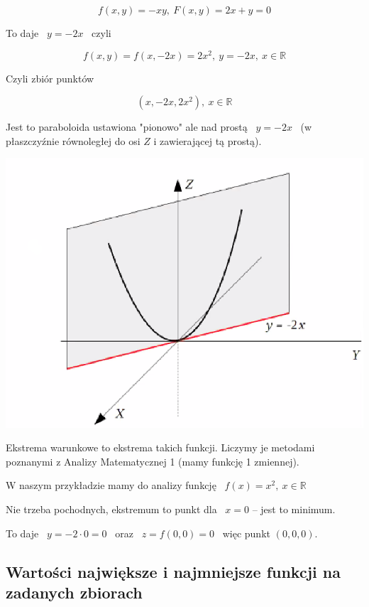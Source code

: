 \begin{przyklad}

\[ f(x,y) = -xy, \ F(x,y) = 2x + y = 0 \]

\begin{center}To daje \ $ y = -2x $ \ czyli\end{center} 
\[ f(x,y) = f(x, -2x) = 2x^2, \ y=-2x, \ x\in \mathbb{R} \]

\begin{center}Czyli zbiór punktów\end{center}
\[ (x, -2x, 2x^2), \ x \in \mathbb{R} \]

Jest to paraboloida ustawiona "pionowo" ale nad prostą \ $ y= -2x $ \ (w płaszczyźnie równoległej do osi $Z$ i zawierającej tą prostą).

\begin{center}
\includegraphics[scale=0.5]{img/paraboloida_przyklad.png}
\end{center}


Ekstrema warunkowe to ekstrema takich funkcji. Liczymy je metodami poznanymi z Analizy Matematycznej 1 (mamy funkcję 1 zmiennej).

W naszym przykładzie mamy do analizy funkcję \ $ f(x) = x^2, \ x \in \mathbb{R} $

Nie trzeba pochodnych, ekstremum to punkt dla \ $x = 0$ -- jest to minimum.

To daje \ $ y = -2 \cdot 0 = 0 $ \ oraz \ $ z = f(0,0) = 0 $ \ więc punkt $ (0,0,0) $.
\end{przyklad}

\subsection{Wartości największe i najmniejsze funkcji na zadanych zbiorach}

